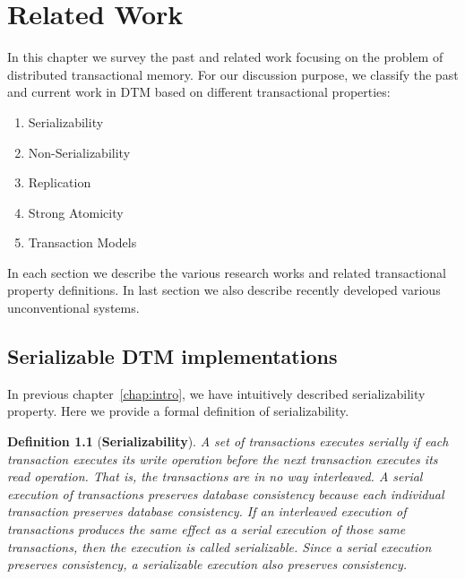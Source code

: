 \documentclass[12pt,english]{report}
\newtheorem{definition}{Definition}[section]
\begin{document}

\chapter{Related Work}\label{chap:relWork}

In this chapter we survey the past and related work focusing on the problem of distributed transactional memory. For our discussion purpose, we classify the past and current work in DTM based on different transactional properties:

\begin{enumerate}
\item Serializability
\item Non-Serializability 
\item Replication 
\item Strong Atomicity
\item Transaction Models
\end{enumerate}

In each section we describe the various research works and related transactional property definitions. In last section we also describe recently developed various unconventional systems.

\section{Serializable DTM implementations}

In previous chapter~\ref{chap:intro}, we have intuitively described serializability property. Here we provide a formal definition of serializability. 

\begin{definition}[\textbf{Serializability}]
A set of transactions executes serially if each transaction executes its write operation before the next transaction executes its read operation. That is, the transactions are in no way interleaved. A serial execution of transactions preserves database consistency because each individual transaction preserves
database consistency. If an interleaved execution of transactions produces the same effect as a serial execution of those same transactions, then the execution is called serializable. Since a serial execution preserves consistency, a serializable execution also preserves consistency.~\cite{serializabilityFormal}
\end{definition}
\end{document}
